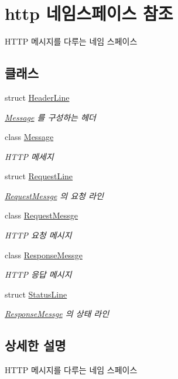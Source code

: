 \hypertarget{namespacehttp}{}\section{http 네임스페이스 참조}
\label{namespacehttp}


H\+T\+TP 메시지를 다루는 네임 스페이스  


\subsection*{클래스}
\begin{DoxyCompactItemize}
\item 
struct \hyperlink{structhttp_1_1_header_line}{Header\+Line}
\begin{DoxyCompactList}\small\item\em \hyperlink{classhttp_1_1_message}{Message} 를 구성하는 헤더 \end{DoxyCompactList}\item 
class \hyperlink{classhttp_1_1_message}{Message}
\begin{DoxyCompactList}\small\item\em H\+T\+TP 메세지 \end{DoxyCompactList}\item 
struct \hyperlink{structhttp_1_1_request_line}{Request\+Line}
\begin{DoxyCompactList}\small\item\em \hyperlink{classhttp_1_1_request_messge}{Request\+Messge} 의 요청 라인 \end{DoxyCompactList}\item 
class \hyperlink{classhttp_1_1_request_messge}{Request\+Messge}
\begin{DoxyCompactList}\small\item\em H\+T\+TP 요청 메시지 \end{DoxyCompactList}\item 
class \hyperlink{classhttp_1_1_response_messge}{Response\+Messge}
\begin{DoxyCompactList}\small\item\em H\+T\+TP 응답 메시지 \end{DoxyCompactList}\item 
struct \hyperlink{structhttp_1_1_status_line}{Status\+Line}
\begin{DoxyCompactList}\small\item\em \hyperlink{classhttp_1_1_response_messge}{Response\+Messge} 의 상태 라인 \end{DoxyCompactList}\end{DoxyCompactItemize}


\subsection{상세한 설명}
H\+T\+TP 메시지를 다루는 네임 스페이스 